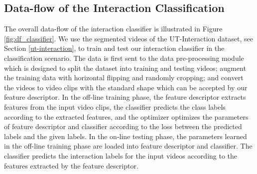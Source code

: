 \subsection{Data-flow of the Interaction Classification}
The overall data-flow of the interaction classifier is illustrated in Figure \ref{fig:df_classifier}. We use the segmented videos of the UT-Interaction dataset, see Section \ref{ut-interaction}, to train and test our interaction classifier in the classification scenario. The data is first sent to the data pre-processing module which is designed to split the dataset into training and testing videos; augment the training data with horizontal flipping and randomly cropping; and convert the videos to video clips with the standard shape which can be accepted by our feature descriptor. In the off-line training phase, the feature descriptor extracts features from  the input video clips, the classifier predicts the class labels according to the extracted features, and the optimizer optimizes the parameters of feature descriptor and classifier according to the loss between the predicted labels and the given labels. In the on-line testing phase, the parameters learned in the off-line training phase are loaded into feature descriptor and classifier. The classifier predicts the interaction labels for the input videos according to the features extracted by the feature descriptor.
